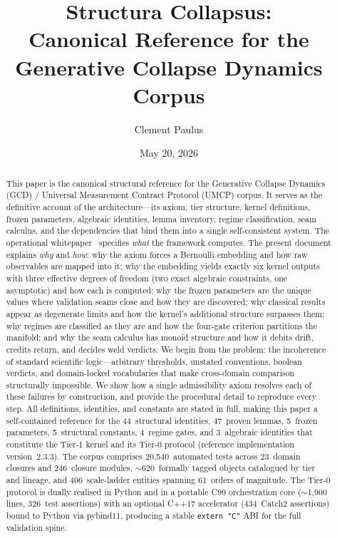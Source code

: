 \documentclass[
  aps,
  prd,
  twocolumn,
  superscriptaddress,
  nofootinbib,
  floatfix
]{revtex4-2}
\begin{document}
\title{Structura Collapsus:
\texorpdfstring{\\}{: }Canonical Reference for the
Generative Collapse Dynamics Corpus}

\author{Clement Paulus}

\date{May 20, 2026}

\begin{abstract}
This paper is the canonical structural reference for the
Generative Collapse Dynamics (GCD) / Universal Measurement
Contract Protocol (UMCP) corpus.  It serves as the definitive
account of the architecture---its axiom, tier structure, kernel
definitions, frozen parameters, algebraic identities, lemma
inventory, regime classification, seam calculus, and the
dependencies that bind them into a single self-consistent system.
The operational whitepaper~\cite{umcpmetadatarepo} specifies
\emph{what} the framework computes.  The present document
explains \emph{why} and \emph{how}: why the axiom forces a
Bernoulli embedding and how raw observables are mapped into it;
why the embedding yields exactly six kernel outputs with three
effective degrees of freedom (two exact algebraic constraints,
one asymptotic) and how each is computed; why the
frozen parameters are the unique values where validation seams
close and how they are discovered; why classical results appear
as degenerate limits and how the kernel's additional structure
surpasses them; why regimes are classified as they are and how
the four-gate criterion partitions the manifold; and why the
seam calculus has monoid structure and how it debits drift,
credits return, and decides weld verdicts.  We begin from the
problem: the incoherence of standard scientific logic---arbitrary
thresholds, unstated conventions, boolean verdicts, and
domain-locked vocabularies that make cross-domain comparison
structurally impossible.  We show how a single admissibility
axiom resolves each of these failures by construction, and
provide the procedural detail to reproduce every step.  All
definitions, identities, and constants are stated in full,
making this paper a self-contained reference for the
44~structural identities, 47~proven lemmas, 5~frozen parameters,
5~structural constants, 4~regime gates, and 3~algebraic
identities that constitute the Tier-1 kernel and its Tier-0
protocol (reference implementation version~2.3.3).  The corpus
comprises 20{,}540~automated tests across 23~domain closures and
246~closure modules, $\sim$620~formally tagged objects catalogued
by tier and lineage, and 406~scale-ladder entities spanning
61~orders of magnitude.  The Tier-0 protocol is dually realised in
Python and in a portable C99 orchestration core ($\sim$1{,}900
lines, 326~test assertions) with an optional C++17 accelerator
(434~Catch2 assertions) bound to Python via pybind11, producing a
stable \texttt{extern "C"} ABI for the full validation spine.
\end{abstract}
\end{document}
